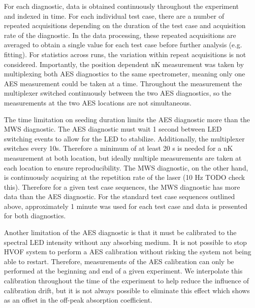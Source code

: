 For each diagnostic, data is obtained continuously throughout the experiment and indexed in time. For each individual test case, there are a number of repeated acquisitions depending on the duration of the test case and acquisition rate of the diagnostic. In the data processing, these repeated acquisitions are averaged to obtain a single value for each test case before further analysis (e.g. fitting). For statistics across runs, the variation within repeat acquisitions is not considered. Importantly, the position dependent nK measurement was taken by multiplexing both AES diagnostics to the same spectrometer, meaning only one AES measurement could be taken at a time. Throughout the measurement the multiplexer switched continuously between the two AES diagnostics, so the measurements at the two AES locations are not simultaneous. 

The time limitation on seeding duration limits the AES diagnostic more than the MWS diagnostic. The AES diagnostic must wait 1 second between LED switching events to allow for the LED to stabilize. Additionally, the multiplexer switches every 10s. Therefore a minimum of at least 20 s is needed for a nK measurement at both location, but ideally multiple measurements are taken at each location to ensure reproducibility. The MWS diagnostic, on the other hand, is continuously acquiring at the repetition rate of the laser (10 Hz TODO check this). Therefore for a given test case sequences, the MWS diagnostic has more data than the AES diagnostic. For the standard test case sequences outlined above, approximately 1 minute was used for each test case and data is presented for both diagnostics.  

Another limitation of the AES diagnostic is that it must be calibrated to the spectral LED intensity without any absorbing medium. It is not possible to stop HVOF system to perform a AES calibration without risking the system not being able to restart. Therefore, measurements of the AES calibration can only be performed at the beginning and end of a given experiment. We interpolate this calibration throughout the time of the experiment to help reduce the influence of calibration drift, but it is not always possible to eliminate this effect which shows as an offset in the off-peak absorption coefficient.

